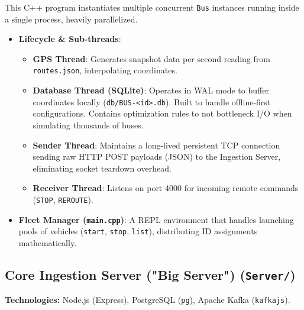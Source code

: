 \documentclass[12pt, a4paper]{article}
\begin{document}
This C++ program instantiates multiple concurrent \texttt{Bus} instances running inside a single process, heavily parallelized.
\begin{itemize}
    \item \textbf{Lifecycle \& Sub-threads}:
    \begin{itemize}
        \item \textbf{GPS Thread}: Generates snapshot data per second reading from \texttt{routes.json}, interpolating coordinates.
        \item \textbf{Database Thread (SQLite)}: Operates in WAL mode to buffer coordinates locally (\texttt{db/BUS-<id>.db}). Built to handle offline-first configurations. Contains optimization rules to not bottleneck I/O when simulating thousands of buses.
        \item \textbf{Sender Thread}: Maintains a long-lived persistent TCP connection sending raw HTTP POST payloads (JSON) to the Ingestion Server, eliminating socket teardown overhead.
        \item \textbf{Receiver Thread}: Listens on port 4000 for incoming remote commands (\texttt{STOP}, \texttt{REROUTE}).
    \end{itemize}
    \item \textbf{Fleet Manager (\texttt{main.cpp})}: A REPL environment that handles launching pools of vehicles (\texttt{start}, \texttt{stop}, \texttt{list}), distributing ID assignments mathematically.
\end{itemize}

\subsection{Core Ingestion Server ("Big Server") (\texttt{Server/})}
\textbf{Technologies:} Node.js (Express), PostgreSQL (\texttt{pg}), Apache Kafka (\texttt{kafkajs}).
\end{document}
